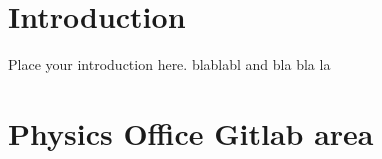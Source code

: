 \documentclass[NOTE, atlasdraft=true, texlive=2016, UKenglish]{\ATLASLATEXPATH atlasdoc}
\begin{document}
\maketitle

\tableofcontents


\section{Introduction}
\label{sec:intro}

Place your introduction here.  blablabl and bla bla la


\section{Physics Office Gitlab area}%
\label{sec:pogitlab}

\end{document}
